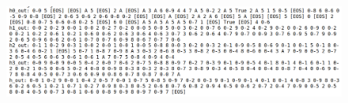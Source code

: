 \documentclass[10pt,a4paper]{article}
\begin{document}
\begin{figure}[p]
    \vspace{0.5em}
    
    \includegraphics[width=\textwidth,height=0.19\textheight,keepaspectratio]{random_tokens_decoding.png}
    \label{fig:random}
\end{figure}
\end{document}
